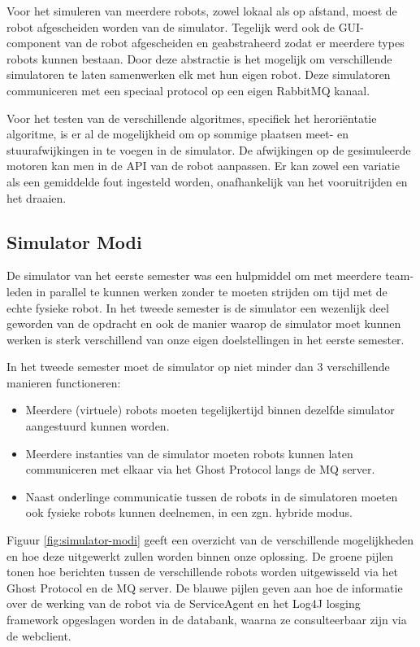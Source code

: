 \documentclass[12pt,a4paper]{report}
\begin{document}
Voor het simuleren van meerdere robots, zowel lokaal als op afstand, moest de robot afgescheiden worden van de simulator. Tegelijk werd ook de GUI-component van de robot afgescheiden en geabstraheerd zodat er meerdere types robots kunnen bestaan. Door deze abstractie is het mogelijk om verschillende simulatoren te laten samenwerken elk met hun eigen robot. Deze simulatoren communiceren met een speciaal protocol op een eigen RabbitMQ kanaal.

Voor het testen van de verschillende algoritmes, specifiek het herori\"entatie algoritme, is er al de mogelijkheid om op sommige plaatsen meet- en stuurafwijkingen in te voegen in de simulator. De afwijkingen op de gesimuleerde motoren kan men in de API van de robot aanpassen. Er kan zowel een variatie als een gemiddelde fout ingesteld worden, onafhankelijk van het vooruitrijden en het draaien.

\subsection{Simulator Modi}

De simulator van het eerste semester was een hulpmiddel om met meerdere team-leden in parallel te kunnen werken zonder te moeten strijden om tijd met de echte fysieke robot. In het tweede semester is de simulator een wezenlijk deel geworden van de opdracht en ook de manier waarop de simulator moet kunnen werken is sterk verschillend van onze eigen doelstellingen in het eerste semester.

In het tweede semester moet de simulator op niet minder dan 3 verschillende manieren functioneren:

\begin{itemize}
\item Meerdere (virtuele) robots moeten tegelijkertijd binnen dezelfde simulator aangestuurd kunnen worden.
\item Meerdere instanties van de simulator moeten robots kunnen laten communiceren met elkaar via het Ghost Protocol langs de MQ server.
\item Naast onderlinge communicatie tussen de robots in de simulatoren moeten ook fysieke robots kunnen deelnemen, in een zgn. hybride modus.
\end{itemize}

Figuur \ref{fig:simulator-modi} geeft een overzicht van de verschillende mogelijkheden en hoe deze uitgewerkt zullen worden binnen onze oplossing. De groene pijlen tonen hoe berichten tussen de verschillende robots worden uitgewisseld via het Ghost Protocol en de MQ server. De blauwe pijlen geven aan hoe de informatie over de werking van de robot via de ServiceAgent en het Log4J losging framework opgeslagen worden in de databank, waarna ze consulteerbaar zijn via de webclient.
\end{document}
